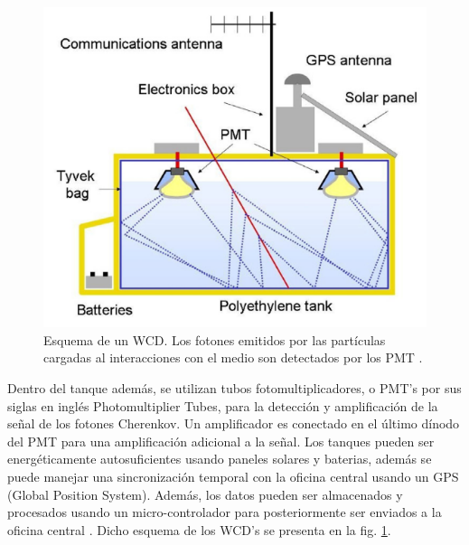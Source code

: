 		\begin{figure}[h]
			\centering
			\includegraphics[scale = 0.5]{FIGURAS/TANQUE_CHERENKOV.png}
			\caption{Esquema de un WCD. Los fotones emitidos por las partículas cargadas al interacciones con el medio son detectados por los PMT \cite{LU2020163678}.}
			\label{TANQUE_CHERENKOV}
		\end{figure}
	
		Dentro del tanque además, se utilizan tubos fotomultiplicadores, o PMT's por sus siglas en inglés Photomultiplier Tubes, para la detección y amplificación de la señal de los fotones Cherenkov. Un amplificador es conectado en el último dínodo del PMT para una amplificación adicional a la señal. Los tanques pueden ser energéticamente autosuficientes usando paneles solares y baterias, además se puede manejar una sincronización temporal con la oficina central usando un GPS (Global Position System). Además, los datos pueden ser almacenados y procesados usando un micro-controlador para posteriormente ser enviados a la oficina central \cite{LU2020163678}. Dicho esquema de los WCD's se presenta en la fig. \ref{TANQUE_CHERENKOV}.
